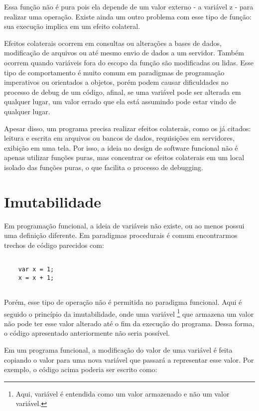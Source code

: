 Essa função não é pura pois ela depende de um 
valor externo - a variável z - para realizar 
uma operação. Existe ainda um outro problema 
com esse tipo de função: sua execução implica em 
um efeito colateral.

Efeitos colaterais ocorrem em consultas ou 
alterações a bases de dados, modificação de 
arquivos ou até mesmo envio de dados a um 
servidor. Também ocorrem quando variáveis fora 
do escopo da função são modificadas ou lidas. 
Esse tipo de comportamento é muito comum em 
paradigmas de programação imperativos ou 
orientados a objetos, porém 
podem causar dificuldades no processo de 
debug de um código, afinal, se uma variável 
pode ser alterada em qualquer lugar, um 
valor errado que ela está assumindo pode 
estar vindo de qualquer lugar.

Apesar disso, um programa precisa realizar 
efeitos colaterais, como os já citados: 
leitura e escrita em arquivos ou bancos de 
dados, requisições em servidores, exibição em 
uma tela. Por isso, a ideia no design de software 
funcional não é apenas utilizar funções puras, 
mas concentrar os efeitos colaterais em um local 
isolado das funções puras, o que facilita o 
processo de debugging.


\section{Imutabilidade}

Em programação funcional, a ideia de variáveis não 
existe, ou ao menos possui uma definição diferente. 
Em paradigmas procedurais é comum encontrarmos trechos 
de código parecidos com:

\begin{lstlisting}[caption={Exemplo de Código Mutável},label=mutablevar]

    var x = 1;
    x = x + 1;


\end{lstlisting}

Porém, esse tipo de operação não é permitida no 
paradigma funcional. Aqui é seguido o princípio 
da imutabilidade, onde uma variável \footnote{Aqui, 
variável é entendida como um valor armazenado 
e não um valor variável.} que armazena um valor 
não pode ter esse valor alterado até o fim da 
execução do programa. Dessa forma, 
o código apresentado anteriormente não seria 
possível.

Em um programa funcional, a modificação do valor 
de uma variável é feita copiando o valor para uma 
nova variável que passará a representar esse valor. 
Por exemplo, o código acima poderia ser escrito 
como:

